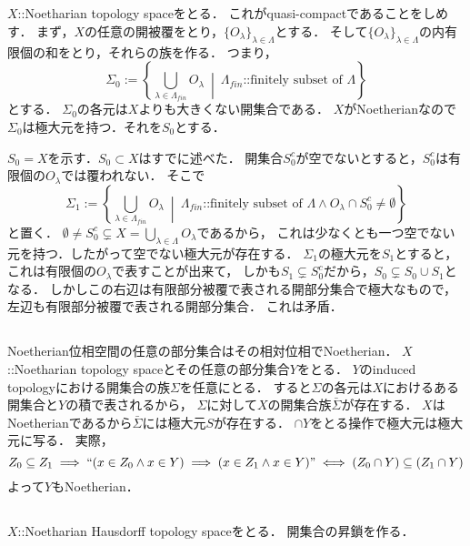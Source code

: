 \documentclass[a4paper]{jsarticle}
\begin{document}
\subsection{}
    $X$::Noetharian topology spaceをとる．
    これがquasi-compactであることをしめす．
    まず，$X$の任意の開被覆をとり，$\{O_{\lambda}\}_{\lambda \in \Lambda}$とする．
    そして$\{O_{\lambda}\}_{\lambda \in \Lambda}$の内有限個の和をとり，それらの族を作る．
    つまり，
    \[ \Sigma_0:=\left\{ \bigcup_{\lambda \in \Lambda_{fin}}O_{\lambda} ~\middle|~ \Lambda_{fin} \mbox{::finitely subset of }\Lambda \right\} \]
    とする．
    $\Sigma_0$の各元は$X$よりも大きくない開集合である．
    $X$がNoetherianなので$\Sigma_0$は極大元を持つ．それを$S_0$とする．

    $S_0=X$を示す．$S_0 \subset X$はすでに述べた．
    開集合$S_0^c$が空でないとすると，$S_0^c$は有限個の$O_{\lambda}$では覆われない．
    そこで
    \[
        \Sigma_1:=
    \left\{ \bigcup_{\lambda \in \Lambda_{fin}}O_{\lambda}
            ~\middle|~
            \Lambda_{fin} \mbox{::finitely subset of }\Lambda \land O_{\lambda} \cap S_0^c \neq \emptyset \right\} \]
    と置く．
    $\emptyset \neq S_0^c \subsetneq X=\bigcup_{\lambda \in \Lambda}O_{\lambda}$であるから，
    これは少なくとも一つ空でない元を持つ．したがって空でない極大元が存在する．
    $\Sigma_1$の極大元を$S_1$とすると，これは有限個の$O_{\lambda}$で表すことが出来て，
    しかも$S_1 \subsetneq S_0^c$だから，$S_0 \subsetneq S_0 \cup S_1$となる．
    しかしこの右辺は有限部分被覆で表される開部分集合で極大なもので，左辺も有限部分被覆で表される開部分集合．
    これは矛盾．

\subsection{}
    Noetherian位相空間の任意の部分集合はその相対位相でNoetherian．
    $X$::Noetharian topology spaceとその任意の部分集合$Y$をとる．
    $Y$のinduced topologyにおける開集合の族$\Sigma$を任意にとる．
    すると$\Sigma$の各元は$X$におけるある開集合と$Y$の積で表されるから，
    $\Sigma$に対して$X$の開集合族$\bar{\Sigma}$が存在する．
    $X$はNoetherianであるから$\bar{\Sigma}$には極大元$S$が存在する．
    $\cap Y$をとる操作で極大元は極大元に写る．
    実際，
    \[ Z_0 \subseteq Z_1 \implies ``(x \in Z_0 \land x \in Y) \implies (x \in Z_1 \land x \in Y)" \iff (Z_0 \cap Y) \subseteq (Z_1 \cap Y) \]
    よって$Y$もNoetherian．

\subsection{}
    $X$::Noetharian Hausdorff topology spaceをとる．
    開集合の昇鎖を作る．
\end{document}

